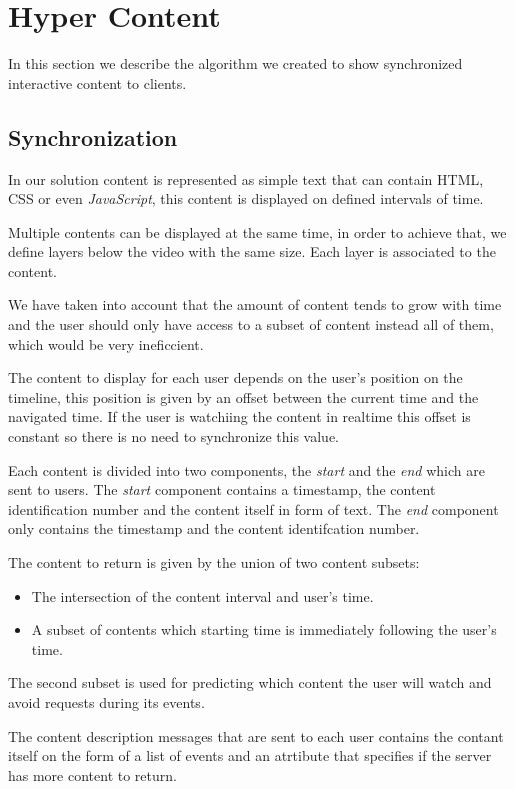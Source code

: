 \section{Hyper Content}
	In this section we describe the algorithm we created to show synchronized interactive content to clients.

	\subsection{Synchronization}

	In our solution content is represented as simple text that can contain \ac{HTML}, \ac{CSS} or even \emph{JavaScript}, this content is displayed on defined intervals of time.

	Multiple contents can be displayed at the same time, in order to achieve that, we define layers below the video with the same size. Each layer is associated to the content.

	We have taken into account that the amount of content tends to grow with time and the user should only have access to a subset of content instead all of them, which would be very ineficcient.

	The content to display for each user depends on the user's position on the timeline, this position is given by an offset between the current time and the navigated time. If the user is watchiing the content in realtime this offset is constant so there is no need to synchronize this value.

	Each content is divided into two components, the \emph{start} and the \emph{end} which are sent to users. The \emph{start} component contains a timestamp, the content identification number and the content itself in form of text. The \emph{end} component only contains the timestamp and the content identifcation number. 

	The content to return is given by the union of two content subsets:
	\begin{itemize}
		\item The intersection of the content interval and user's time.
		\item A subset of contents which starting time is immediately following the user's time.
	\end{itemize}

	The second subset is used for predicting which content the user will watch and avoid requests during its events.

	The content description messages that are sent to each user contains the contant itself on the form of a list of events and an atrtibute that specifies if the server has more content to return.

